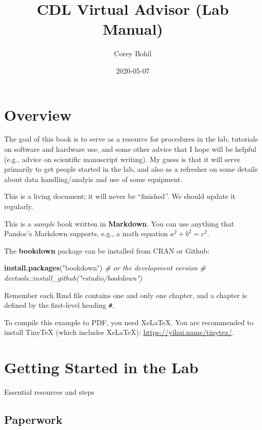 \documentclass[
]{book}
\title{CDL Virtual Advisor (Lab Manual)}
\author{Corey Bohil}
\date{2020-05-07}
\newenvironment{Shaded}{\begin{snugshade}}{\end{snugshade}}
\newcommand{\CommentTok}[1]{\textcolor[rgb]{0.56,0.35,0.01}{\textit{#1}}}
\newcommand{\KeywordTok}[1]{\textcolor[rgb]{0.13,0.29,0.53}{\textbf{#1}}}
\newcommand{\NormalTok}[1]{#1}
\newcommand{\StringTok}[1]{\textcolor[rgb]{0.31,0.60,0.02}{#1}}
\begin{document}
\maketitle

{
\setcounter{tocdepth}{1}
\tableofcontents
}
\hypertarget{overview}{%
\chapter{Overview}\label{overview}}

The goal of this book is to serve as a resource for procedures in the lab, tutorials on software and hardware use, and some other advice that I hope will be helpful (e.g., advice on scientific manuscript writing). My guess is that it will serve primarily to get people started in the lab, and also as a refresher on some details about data handling/analyis and use of some equipment.

This is a living document; it will never be ``finished''. We should update it regularly.

This is a \emph{sample} book written in \textbf{Markdown}. You can use anything that Pandoc's Markdown supports, e.g., a math equation \(a^2 + b^2 = c^2\).

The \textbf{bookdown} package can be installed from CRAN or Github:

\begin{Shaded}
\begin{Highlighting}[]
\KeywordTok{install.packages}\NormalTok{(}\StringTok{"bookdown"}\NormalTok{)}
\CommentTok{# or the development version}
\CommentTok{# devtools::install_github("rstudio/bookdown")}
\end{Highlighting}
\end{Shaded}

Remember each Rmd file contains one and only one chapter, and a chapter is defined by the first-level heading \texttt{\#}.

To compile this example to PDF, you need XeLaTeX. You are recommended to install TinyTeX (which includes XeLaTeX): \url{https://yihui.name/tinytex/}.

\hypertarget{getting_started}{%
\chapter{Getting Started in the Lab}\label{getting_started}}

Essential resources and steps

\hypertarget{paperwork}{%
\section{Paperwork}\label{paperwork}}
\end{document}
